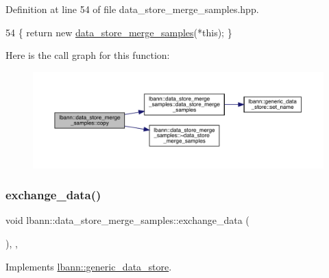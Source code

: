Definition at line 54 of file data\+\_\+store\+\_\+merge\+\_\+samples.\+hpp.


\begin{DoxyCode}
54 \{ \textcolor{keywordflow}{return} \textcolor{keyword}{new} \hyperlink{classlbann_1_1data__store__merge__samples_ada5d181e33c9d9fe69979856b7f26268}{data\_store\_merge\_samples}(*\textcolor{keyword}{this}); \}
\end{DoxyCode}
Here is the call graph for this function\+:\nopagebreak
\begin{figure}[H]
\begin{center}
\leavevmode
\includegraphics[width=350pt]{classlbann_1_1data__store__merge__samples_a37fc606c2347c6c6a24b588665e3cde5_cgraph}
\end{center}
\end{figure}
\mbox{\label{classlbann_1_1data__store__merge__samples_a89dc9b0e04c8279cee5e89be2f2ed2a3}} 
\subsubsection{\texorpdfstring{exchange\+\_\+data()}{exchange\_data()}}
{\footnotesize\ttfamily void lbann\+::data\+\_\+store\+\_\+merge\+\_\+samples\+::exchange\+\_\+data (\begin{DoxyParamCaption}{ }\end{DoxyParamCaption})\hspace{0.3cm}{\ttfamily [override]}, {\ttfamily [protected]}, {\ttfamily [virtual]}}



Implements \hyperlink{classlbann_1_1generic__data__store_a5a34663fbbc3714d45743a6ca7195f51}{lbann\+::generic\+\_\+data\+\_\+store}.




